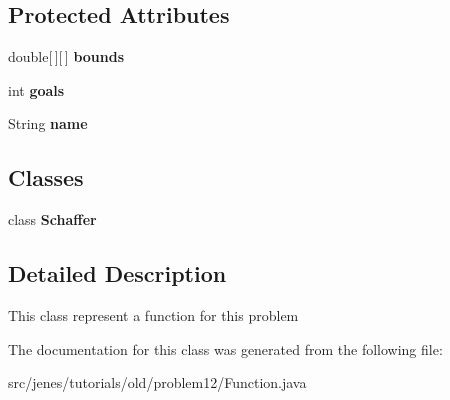 \subsection*{Protected Attributes}
\begin{CompactItemize}
\item 
\hypertarget{classjenes_1_1tutorials_1_1old_1_1problem12_1_1_function_0a732b2084fd09b6d69858b21a780a05}{
double\mbox{[}$\,$\mbox{]}\mbox{[}$\,$\mbox{]} \textbf{bounds}}
\label{classjenes_1_1tutorials_1_1old_1_1problem12_1_1_function_0a732b2084fd09b6d69858b21a780a05}

\item 
\hypertarget{classjenes_1_1tutorials_1_1old_1_1problem12_1_1_function_9ad846e268721b5a9d5d3e15763d5400}{
int \textbf{goals}}
\label{classjenes_1_1tutorials_1_1old_1_1problem12_1_1_function_9ad846e268721b5a9d5d3e15763d5400}

\item 
\hypertarget{classjenes_1_1tutorials_1_1old_1_1problem12_1_1_function_6cc32f98e4932a3251cbaffdf08b9773}{
String \textbf{name}}
\label{classjenes_1_1tutorials_1_1old_1_1problem12_1_1_function_6cc32f98e4932a3251cbaffdf08b9773}

\end{CompactItemize}
\subsection*{Classes}
\begin{CompactItemize}
\item 
class \textbf{Schaffer}
\end{CompactItemize}


\subsection{Detailed Description}
This class represent a function for this problem 

The documentation for this class was generated from the following file:\begin{CompactItemize}
\item 
src/jenes/tutorials/old/problem12/Function.java\end{CompactItemize}
